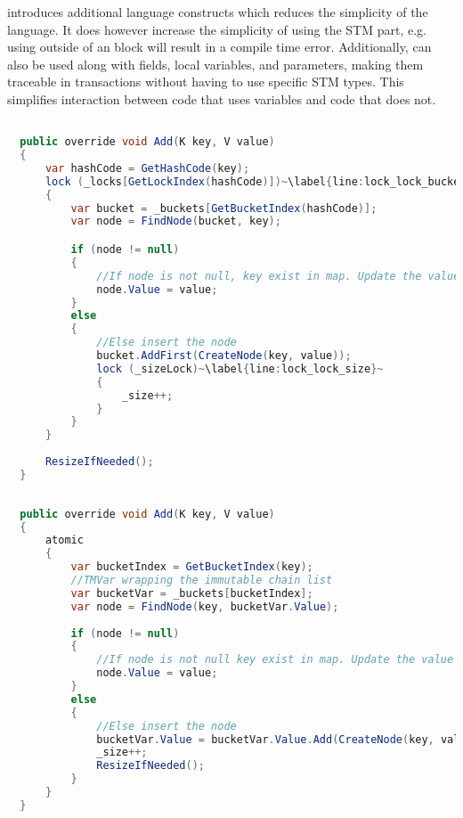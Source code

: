 \stmnamesp introduces additional language constructs which reduces the simplicity of the language. It does however increase the simplicity of using the \ac{STM} part, e.g. using  outside of an  block will result in a compile time error. Additionally,  can also be used along with fields, local variables, and parameters, making them traceable in transactions without having to use specific \ac{STM} types. This simplifies interaction between code that uses  variables and code that does not.

\begin{lstlisting}[label=lst:lock_add_hashmap,
  caption={ConcurrentHashMap \bscode{Add} Method - Locking},
  language=Java,  
  showspaces=false,
  showtabs=false,
  breaklines=true,
  showstringspaces=false,
  breakatwhitespace=true,
  escapechar=~,
  commentstyle=\color{greencomments},
  keywordstyle=\color{bluekeywords},
  stringstyle=\color{redstrings},
  morekeywords={atomic, retry, orelse, var, get, set, ref, out}]  % Start your code-block

  public override void Add(K key, V value)
  {
      var hashCode = GetHashCode(key);
      lock (_locks[GetLockIndex(hashCode)])~\label{line:lock_lock_bucket}~
      {
          var bucket = _buckets[GetBucketIndex(hashCode)];
          var node = FindNode(bucket, key);

          if (node != null)
          {
              //If node is not null, key exist in map. Update the value
              node.Value = value;
          }
          else
          {
              //Else insert the node
              bucket.AddFirst(CreateNode(key, value));
              lock (_sizeLock)~\label{line:lock_lock_size}~
              {
                  _size++;
              }
          }
      }
      
      ResizeIfNeeded();
  }
\end{lstlisting}

\begin{lstlisting}[label=lst:lang_add_hashmap,
  caption={ConcurrentHashMap \bscode{Add} Method - \stmname},
  language=Java,  
  showspaces=false,
  showtabs=false,
  breaklines=true,
  showstringspaces=false,
  breakatwhitespace=true,
  escapechar=~,
  commentstyle=\color{greencomments},
  keywordstyle=\color{bluekeywords},
  stringstyle=\color{redstrings},
  morekeywords={atomic, retry, orelse, var, get, set, ref, out}]  % Start your code-block
  
  public override void Add(K key, V value)
  {
      atomic
      {
          var bucketIndex = GetBucketIndex(key);
          //TMVar wrapping the immutable chain list
          var bucketVar = _buckets[bucketIndex];
          var node = FindNode(key, bucketVar.Value);
         
          if (node != null)
          {
              //If node is not null key exist in map. Update the value
              node.Value = value;
          }
          else
          {
              //Else insert the node
              bucketVar.Value = bucketVar.Value.Add(CreateNode(key, value));
              _size++;
              ResizeIfNeeded();
          }
      }
  }
\end{lstlisting}

